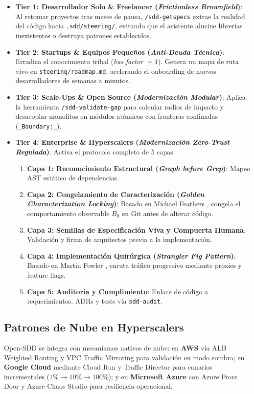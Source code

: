 \documentclass[11pt,a4paper]{article}
\begin{document}
\begin{itemize}
    \item \textbf{Tier 1: Desarrollador Solo \& Freelancer (\textit{Frictionless Brownfield})}: Al retomar proyectos tras meses de pausa, \texttt{/sdd-getspecs} extrae la realidad del código hacia \texttt{.sdd/steering/}, evitando que el asistente alucine librerías inexistentes o destruya patrones establecidos.
    \item \textbf{Tier 2: Startups \& Equipos Pequeños (\textit{Anti-Deuda Técnica})}: Erradica el conocimiento tribal (\textit{bus factor} $= 1$). Genera un mapa de ruta vivo en \texttt{steering/\allowbreak roadmap.md}, acelerando el onboarding de nuevos desarrolladores de semanas a minutos.
    \item \textbf{Tier 3: Scale-Ups \& Open Source (\textit{Modernización Modular})}: Aplica la herramienta \texttt{/sdd-validate-gap} para calcular radios de impacto y desacoplar monolitos en módulos atómicos con fronteras confinadas (\texttt{\_Boundary:\_}).
    \item \textbf{Tier 4: Enterprise \& Hyperscalers (\textit{Modernización Zero-Trust Regulada})}: Activa el protocolo completo de 5 capas:
    \begin{enumerate}
        \item \textbf{Capa 1: Reconocimiento Estructural (\textit{Graph before Grep})}: Mapeo AST estático de dependencias.
        \item \textbf{Capa 2: Congelamiento de Caracterización (\textit{Golden Characterization Locking})}: Basado en Michael Feathers \cite{feathers2004working}, congela el comportamiento observable $B_0$ en Git antes de alterar código.
        \item \textbf{Capa 3: Semillas de Especificación Viva y Compuerta Humana}: Validación y firma de arquitectos previa a la implementación.
        \item \textbf{Capa 4: Implementación Quirúrgica (\textit{Strangler Fig Pattern})}: Basado en Martin Fowler \cite{fowler2004strangler}, enruta tráfico progresivo mediante proxies y feature flags.
        \item \textbf{Capa 5: Auditoría y Cumplimiento}: Enlace de código a requerimientos, ADRs y tests vía \texttt{sdd-audit}.
    \end{enumerate}
\end{itemize}

\subsection{Patrones de Nube en Hyperscalers}
Open-SDD se integra con mecanismos nativos de nube: en \textbf{AWS} vía ALB Weighted Routing y VPC Traffic Mirroring para validación en modo sombra; en \textbf{Google Cloud} mediante Cloud Run y Traffic Director para canarios incrementales ($1\% \to 10\% \to 100\%$); y en \textbf{Microsoft Azure} con Azure Front Door y Azure Chaos Studio para resiliencia operacional.
\end{document}
